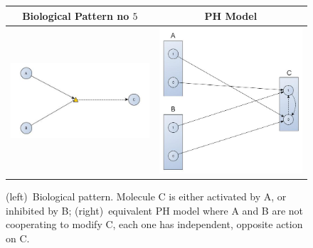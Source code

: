 \documentclass[11pt,a4paper,twoside]{epig}
\begin{document}
\begin{figure}[ht]
\begin{tabular}{|c|c|}
\hline
Biological Pattern no $5$ & PH Model \\
\hline
 \includegraphics[scale=0.3]{./imagesannexe/phdrawings/5cyt.jpg} & \includegraphics[scale=0.14]{./imagesannexe/phdrawings/5ph.jpg} \\
 \hline
\end{tabular}
\caption{\label{fig:pattern:5}
(left)~Biological pattern. Molecule C is either activated by A, or inhibited by B;
(right)~equivalent PH model where A and B are not cooperating to modify C, each one has independent, opposite action on C.
}
\end{figure}
\end{document}
